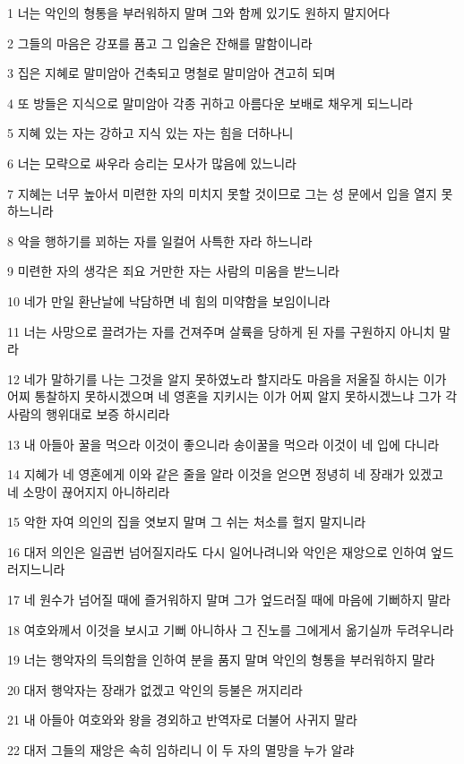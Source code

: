 \par 1 너는 악인의 형통을 부러워하지 말며 그와 함께 있기도 원하지 말지어다
\par 2 그들의 마음은 강포를 품고 그 입술은 잔해를 말함이니라
\par 3 집은 지혜로 말미암아 건축되고 명철로 말미암아 견고히 되며
\par 4 또 방들은 지식으로 말미암아 각종 귀하고 아름다운 보배로 채우게 되느니라
\par 5 지혜 있는 자는 강하고 지식 있는 자는 힘을 더하나니
\par 6 너는 모략으로 싸우라 승리는 모사가 많음에 있느니라
\par 7 지혜는 너무 높아서 미련한 자의 미치지 못할 것이므로 그는 성 문에서 입을 열지 못하느니라
\par 8 악을 행하기를 꾀하는 자를 일컬어 사특한 자라 하느니라
\par 9 미련한 자의 생각은 죄요 거만한 자는 사람의 미움을 받느니라
\par 10 네가 만일 환난날에 낙담하면 네 힘의 미약함을 보임이니라
\par 11 너는 사망으로 끌려가는 자를 건져주며 살륙을 당하게 된 자를 구원하지 아니치 말라
\par 12 네가 말하기를 나는 그것을 알지 못하였노라 할지라도 마음을 저울질 하시는 이가 어찌 통찰하지 못하시겠으며 네 영혼을 지키시는 이가 어찌 알지 못하시겠느냐 그가 각 사람의 행위대로 보증 하시리라
\par 13 내 아들아 꿀을 먹으라 이것이 좋으니라 송이꿀을 먹으라 이것이 네 입에 다니라
\par 14 지혜가 네 영혼에게 이와 같은 줄을 알라 이것을 얻으면 정녕히 네 장래가 있겠고 네 소망이 끊어지지 아니하리라
\par 15 악한 자여 의인의 집을 엿보지 말며 그 쉬는 처소를 헐지 말지니라
\par 16 대저 의인은 일곱번 넘어질지라도 다시 일어나려니와 악인은 재앙으로 인하여 엎드러지느니라
\par 17 네 원수가 넘어질 때에 즐거워하지 말며 그가 엎드러질 때에 마음에 기뻐하지 말라
\par 18 여호와께서 이것을 보시고 기뻐 아니하사 그 진노를 그에게서 옮기실까 두려우니라
\par 19 너는 행악자의 득의함을 인하여 분을 품지 말며 악인의 형통을 부러워하지 말라
\par 20 대저 행악자는 장래가 없겠고 악인의 등불은 꺼지리라
\par 21 내 아들아 여호와와 왕을 경외하고 반역자로 더불어 사귀지 말라
\par 22 대저 그들의 재앙은 속히 임하리니 이 두 자의 멸망을 누가 알랴
